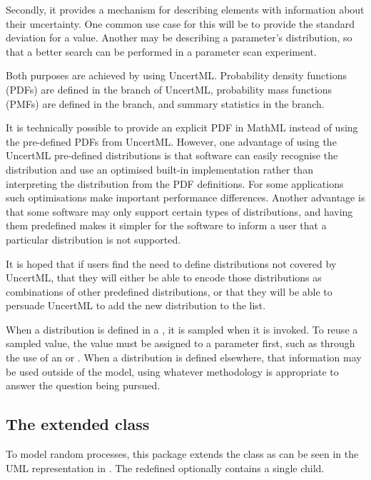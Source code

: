 \documentclass[draftspec]{sbmlpkgspec}
\newcommand{\uncertml}{UncertML\xspace}
\begin{document}
Secondly, it provides a mechanism for describing elements with information about their uncertainty.  One common use case for this will be to provide the standard deviation for a value.  Another may be describing a parameter's distribution, so that a better search can be performed in a parameter scan experiment.

Both purposes are achieved by using \uncertml.  Probability density functions (PDFs) are defined in the  branch of \uncertml, probability mass functions (PMFs) are defined in the  branch, and summary statistics in the  branch.


It is technically possible to provide an explicit PDF in MathML instead of using the pre-defined PDFs from \uncertml.  However, one advantage of using the UncertML pre-defined
distributions is that software can easily recognise the distribution
and use an optimised built-in implementation rather than interpreting
the distribution from the PDF definitions. For some
applications such optimisations make important performance
differences.  Another advantage is that some software may only support certain types of distributions, and having them predefined makes it simpler for the software to inform a user that a particular distribution is not supported.

It is hoped that if users find the need to define distributions not covered by UncertML, that they will either be able to encode those distributions as combinations of other predefined distributions, or that they will be able to persuade \uncertml to add the new distribution to the list.

When a distribution is defined in a \FunctionDefinition, it is sampled when it is invoked. To reuse a
sampled value, the value must be assigned to a parameter first, such as through the use of an \InitialAssignment or \EventAssignment.  When a distribution is defined elsewhere, that information may be used outside of the model, using whatever methodology is appropriate to answer the question being pursued.


\subsection{The extended  class}

To model random processes, this package extends the \FunctionDefinition class as
can be seen in the UML representation in . The redefined \FunctionDefinition optionally
contains a single  child.
\end{document}
